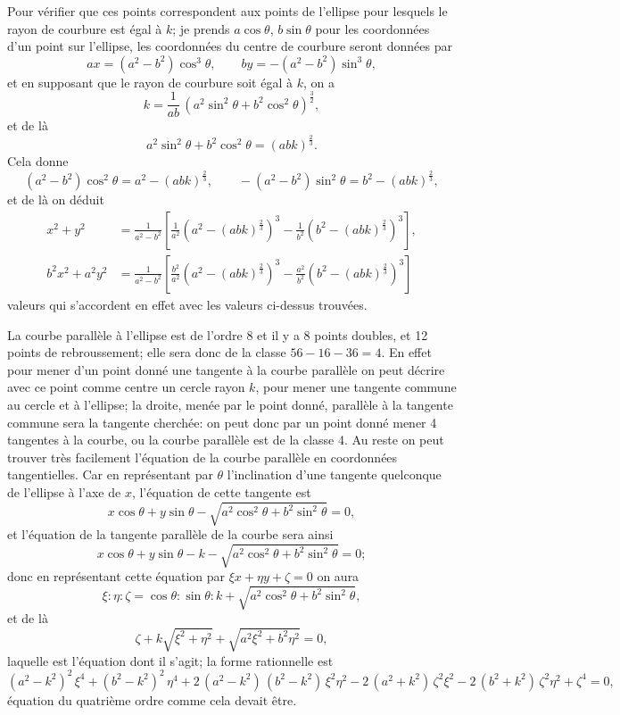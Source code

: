 \documentclass[11pt,a4paper]{article}
\theoremstyle{plain}
\theoremstyle{definition}
\begin{document}
Pour v\'{e}rifier que ces points correspondent aux points de l'ellipse pour lesquels le rayon de courbure est \'{e}gal \`{a} $k$; je prends $a\cos\theta$, $b\sin\theta$ pour les coordonn\'{e}es d'un point sur l'ellipse, les coordonn\'{e}es du centre de courbure seront donn\'{e}es par
\[
ax = (a^2-b^2)\cos^3\theta, \qquad by = -(a^2-b^2)\sin^3\theta,
\]
et en supposant que le rayon de courbure soit \'{e}gal \`{a} $k$, on a
\[
k = \frac{1}{ab}\,(a^2\sin^2\theta + b^2\cos^2\theta)^{\frac{3}{2}},
\]
et de l\`{a}
\[
a^2\sin^2\theta + b^2\cos^2\theta = (abk)^{\frac{2}{3}}.
\]
Cela donne
\[
(a^2-b^2)\cos^2\theta = a^2 - (abk)^{\frac{2}{3}}, \qquad -(a^2-b^2)\sin^2\theta = b^2 - (abk)^{\frac{2}{3}},
\]
et de l\`{a} on d\'{e}duit
\begin{align*}
x^2 + y^2 &= \frac{1}{a^2-b^2}\left[\frac{1}{a^2}\left(a^2-(abk)^{\frac{2}{3}}\right)^3 - \frac{1}{b^2}\left(b^2-(abk)^{\frac{2}{3}}\right)^3\right], \\
b^2x^2 + a^2y^2 &= \frac{1}{a^2-b^2}\left[\frac{b^2}{a^2}\left(a^2-(abk)^{\frac{2}{3}}\right)^3 - \frac{a^2}{b^2}\left(b^2-(abk)^{\frac{2}{3}}\right)^3\right]
\end{align*}
valeurs qui s'accordent en effet avec les valeurs ci-dessus trouv\'{e}es.

\newpage
La courbe parall\`{e}le \`{a} l'ellipse est de l'ordre 8 et il y a 8 points doubles, et 12 points de rebroussement; elle sera donc de la classe $56 - 16 - 36 = 4$. En effet pour mener d'un point donn\'{e} une tangente \`{a} la courbe parall\`{e}le on peut d\'{e}crire avec ce point comme centre un cercle rayon $k$, pour mener une tangente commune au cercle et \`{a} l'ellipse; la droite, men\'{e}e par le point donn\'{e}, parall\`{e}le \`{a} la tangente commune sera la tangente cherch\'{e}e: on peut donc par un point donn\'{e} mener 4 tangentes \`{a} la courbe, ou la courbe parall\`{e}le est de la classe 4. Au reste on peut trouver tr\`{e}s facilement l'\'{e}quation de la courbe parall\`{e}le en coordonn\'{e}es tangentielles. Car en repr\'{e}sentant par $\theta$ l'inclination d'une tangente quelconque de l'ellipse \`{a} l'axe de $x$, l'\'{e}quation de cette tangente est
\[
x\cos\theta + y\sin\theta - \sqrt{a^2\cos^2\theta + b^2\sin^2\theta} = 0,
\]
et l'\'{e}quation de la tangente parall\`{e}le de la courbe sera ainsi
\[
x\cos\theta + y\sin\theta - k - \sqrt{a^2\cos^2\theta + b^2\sin^2\theta} = 0;
\]
donc en repr\'{e}sentant cette \'{e}quation par $\xi x + \eta y + \zeta = 0$ on aura
\[
\xi : \eta : \zeta = \cos\theta : \sin\theta : k + \sqrt{a^2\cos^2\theta + b^2\sin^2\theta},
\]
et de l\`{a}
\[
\zeta + k\sqrt{\xi^2+\eta^2} + \sqrt{a^2\xi^2+b^2\eta^2} = 0,
\]
laquelle est l'\'{e}quation dont il s'agit; la forme rationnelle est
\[
(a^2-k^2)^2\,\xi^4 + (b^2-k^2)^2\,\eta^4 + 2\,(a^2-k^2)\,(b^2-k^2)\,\xi^2\eta^2 - 2\,(a^2+k^2)\,\zeta^2\xi^2 - 2\,(b^2+k^2)\,\zeta^2\eta^2 + \zeta^4 = 0,
\]
\'{e}quation du quatri\`{e}me ordre comme cela devait \^{e}tre.
\end{document}
